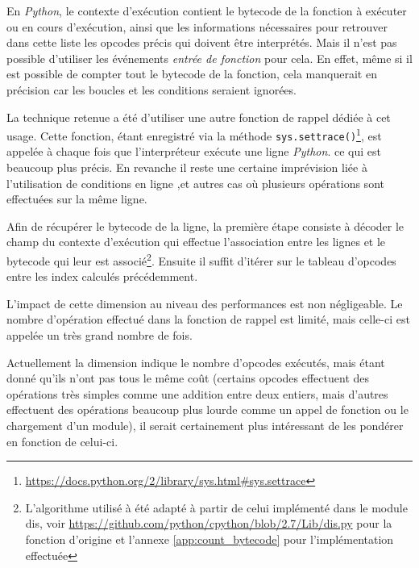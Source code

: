 En \emph{Python}, le contexte d'exécution contient le \gls{bytecode} de la fonction à exécuter ou en cours d'exécution, ainsi que les informations nécessaires pour retrouver dans cette liste les \glspl{opcode} précis qui doivent être interprétés. Mais il n'est pas possible d'utiliser les événements \emph{entrée de fonction} pour cela. En effet, même si il est possible de compter tout le bytecode de la fonction, cela manquerait en précision car les boucles et les conditions seraient ignorées.

La technique retenue a été d'utiliser une autre fonction de rappel dédiée à cet usage. Cette fonction, étant enregistré via la méthode \verb|sys.settrace()|\footnote{\url{https://docs.python.org/2/library/sys.html#sys.settrace}}, est appelée à chaque fois que l'interpréteur exécute une ligne \emph{Python}. ce qui est beaucoup plus précis. En revanche il reste une certaine imprévision liée à l'utilisation de conditions en ligne ,et autres cas où plusieurs opérations sont effectuées sur la même ligne.

Afin de récupérer le \gls{bytecode} de la ligne, la première étape consiste à décoder le champ du contexte d'exécution qui effectue l'association entre les lignes et le bytecode qui leur est associé\footnote{L'algorithme utilisé à été adapté à partir de celui implémenté dans le module dis, voir \url{https://github.com/python/cpython/blob/2.7/Lib/dis.py} pour la fonction d'origine et l'annexe \vref{app:count_bytecode} pour l'implémentation effectuée}. Ensuite il suffit d'itérer sur le tableau d'opcodes entre les index calculés précédemment.

\begin{note}[Performances]
L'impact de cette dimension au niveau des performances est non négligeable. Le nombre d'opération effectué dans la fonction de rappel est limité, mais celle-ci est appelée un très grand nombre de fois.
\end{note}

\begin{note}[Évolutions]
Actuellement la dimension indique le nombre d'\glspl{opcode} exécutés, mais étant donné qu'ils n'ont pas tous le même coût (certains opcodes effectuent des opérations très simples comme une addition entre deux entiers, mais d'autres effectuent des opérations beaucoup plus lourde comme un appel de fonction ou le chargement d'un module), il serait certainement plus intéressant de les pondérer en fonction de celui-ci.
\end{note}

